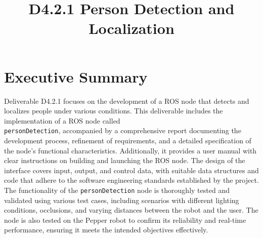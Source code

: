 \documentclass{CSSRforAfrica}
\begin{document}




\title{D4.2.1 Person Detection and Localization}  

\partner{}                                      




\maketitle
 

\section*{Executive Summary}
\label{executive_summary}
Deliverable D4.2.1 focuses on the development of a ROS node that detects and localizes people under various conditions. This deliverable includes the implementation of a ROS node called \\
\texttt{personDetection}, accompanied by a comprehensive report documenting the development process, refinement of requirements, and a detailed specification of the node's functional characteristics. Additionally, it provides a user manual with clear instructions on building and launching the ROS node. The design of the interface covers input, output, and control data, with suitable data structures and code that adhere to the software engineering standards established by the project. The functionality of the \texttt{personDetection} node is thoroughly tested and validated using various test cases, including scenarios with different lighting conditions, occlusions, and varying distances between the robot and the user. The node is also tested on the Pepper robot to confirm its reliability and real-time performance, ensuring it meets the intended objectives effectively.
 
 
\pagebreak
\tableofcontents
\newpage
\end{document}
